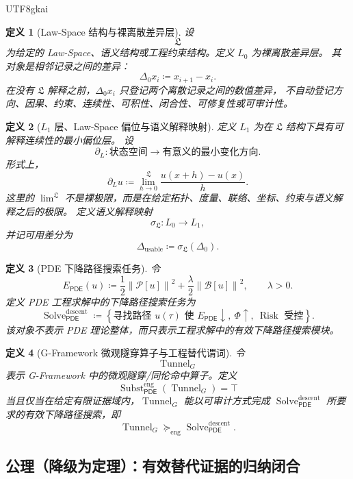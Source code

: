 \documentclass[12pt]{article}
\newtheorem{definition}{定义}[section]
\newcommand{\GFramework}{\textsf{G-Framework}}
\newcommand{\DefEq}{\coloneqq}
\newcommand{\Pcal}{\mathcal P}
\newcommand{\Bcal}{\mathcal B}
\newcommand{\PDE}{\ensuremath{\mathsf{PDE}}}
\newcommand{\norm}[1]{\left\lVert #1 \right\rVert}
\DeclareMathOperator{\Risk}{Risk}
\DeclareMathOperator{\Tunnel}{Tunnel}
\DeclareMathOperator{\Subst}{Subst}
\DeclareMathOperator{\Solve}{Solve}
\begin{document}
\begin{CJK*}{UTF8}{gkai}
\begin{definition}[Law-Space 结构与裸离散差异层]
\label{def:tex58-lawspace-l0}
设
\[
  \mathfrak L
\]
为给定的 Law-Space、语义结构或工程约束结构。定义 \(L_0\) 为裸离散差异层。
其对象是相邻记录之间的差异：
\[
  \Delta_0 x_i
  \DefEq
  x_{i+1}-x_i.
\]
在没有 \(\mathfrak L\) 解释之前，\(\Delta_0 x_i\) 只登记两个离散记录之间的数值差异，
不自动登记方向、因果、约束、连续性、可积性、闭合性、可修复性或可审计性。
\end{definition}

\begin{definition}[\(L_1\) 层、Law-Space 偏位与语义解释映射]
\label{def:tex58-lawspace-l1}
定义 \(L_1\) 为在 \(\mathfrak L\) 结构下具有可解释连续性的最小偏位层。
设
\[
  \partial_L:\text{状态空间}\longrightarrow\text{有意义的最小变化方向}.
\]
形式上，
\[
  \partial_Lu
  \DefEq
  \lim_{h\to0}^{\mathfrak L}
  \frac{u(x+h)-u(x)}{h}.
\]
这里的 \(\lim^{\mathfrak L}\) 不是裸极限，而是在给定拓扑、度量、联络、坐标、约束与语义解释之后的极限。
定义语义解释映射
\[
  \sigma_{\mathfrak L}:L_0\to L_1,
\]
并记可用差分为
\[
  \Delta_{\mathrm{usable}}
  \DefEq
  \sigma_{\mathfrak L}(\Delta_0).
\]
\end{definition}

\begin{definition}[PDE 下降路径搜索任务]
\label{def:tex58-pde-descent-search}
令
\[
  E_{\PDE}(u)
  \DefEq
  \frac12\norm{\Pcal[u]}^2
  +
  \frac{\lambda}{2}\norm{\Bcal[u]}^2,
  \qquad \lambda>0.
\]
定义 PDE 工程求解中的下降路径搜索任务为
\[
  \Solve_{\PDE}^{\mathrm{descent}}
  \DefEq
  \left\{
  \text{寻找路径 }u(\tau)\text{ 使 }
  E_{\PDE}\downarrow,\ \Phi\uparrow,\ \Risk\text{ 受控}
  \right\}.
\]
该对象不表示 PDE 理论整体，而只表示工程求解中的有效下降路径搜索模块。
\end{definition}

\begin{definition}[G-Framework 微观隧穿算子与工程替代谓词]
\label{def:tex58-tunnel-substitution}
令
\[
  \Tunnel_G
\]
表示 \GFramework{} 中的微观隧穿/同伦命中算子。定义
\[
  \Subst_{\PDE}^{\mathrm{eng}}(\Tunnel_G)=\top
\]
当且仅当在给定有限证据域内，\(\Tunnel_G\) 能以可审计方式完成
\(\Solve_{\PDE}^{\mathrm{descent}}\) 所要求的有效下降路径搜索，即
\[
  \Tunnel_G
  \succcurlyeq_{\mathrm{eng}}
  \Solve_{\PDE}^{\mathrm{descent}}.
\]
\end{definition}

\subsection{公理（降级为定理）：有效替代证据的归纳闭合}
\label{subsec:tex58-substitution-induction}


\end{CJK*}
\end{document}
